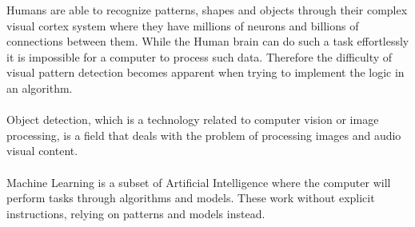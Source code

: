 
Humans are able to recognize patterns, shapes and objects through their complex visual cortex system where they have millions of neurons and
billions of connections between them. While the Human brain can do such a task effortlessly it is impossible for a computer to process such
data. Therefore the difficulty of visual pattern detection becomes apparent when trying to implement the logic in
an algorithm.\cite{neuralnetworksanddeeplearning} \\ \\
Object detection, which is a technology related to computer vision or image processing, is a field that deals with the problem of processing
images and audio visual content.\\ \\
Machine Learning is a subset of Artificial Intelligence where the computer will perform tasks through algorithms and models. These work without explicit instructions, relying on patterns and models instead.

